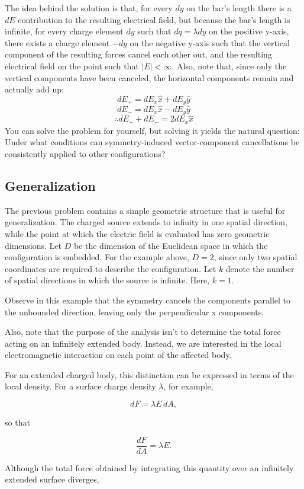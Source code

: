 \documentclass[12pt]{article}
\begin{document}
The idea behind the solution is that, for every $dy$ on the bar's length there is a $dE$ contribution to the resulting electrical field, but because the bar's length is infinite, for every charge element $dy$ such that $dq=\lambda dy$ on the positive y-axis, there exists a charge element $-dy$ on the negative y-axis such that the vertical component of the resulting forces cancel each other out, and the resulting electrical field on the point such that $\mid E\mid<\infty$.
Also, note that, since only the vertical components have been canceled, the horizontal components remain and actually add up:
\[dE_+=dE_x\hat{x}+dE_y\hat{y}\]
\[dE_-=dE_x\hat{x}-dE_y\hat{y}\]
\[\therefore dE_+ +dE_-=2dE_x\hat{x}\]
You can solve the problem for yourself, but solving it yields the natural question:
Under what conditions can symmetry-induced vector-component cancellations be consistently applied to other configurations?

\subsection{Generalization}
The previous problem contains a simple geometric structure that is useful for generalization. The charged source extends to infinity in one spatial direction, while the point at which the electric field is evaluated has zero geometric dimensions. Let $D$ be the dimension of the Euclidean space in which the configuration is embedded. For the example above, $D=2$, since only two spatial coordinates are required to describe the configuration. Let $k$ denote the number of spatial directions in which the source is infinite. Here, $k=1$.

Observe in this example that the symmetry cancels the components parallel to the unbounded direction, leaving only the perpendicular x components.

Also, note that the purpose of the analysis isn't to determine the total force acting on an infinitely extended body. Instead, we are interested in the local electromagnetic interaction on each point of the affected body. 

For an extended charged body, this distinction can be expressed in terms of the local density. For a surface charge density $\lambda$, for example,

\[
d F = \lambda  E\,dA,
\]

so that

\[
\frac{d F}{dA}=\lambda E.
\]

Although the total force obtained by integrating this quantity over an infinitely extended surface diverges,
\end{document}
